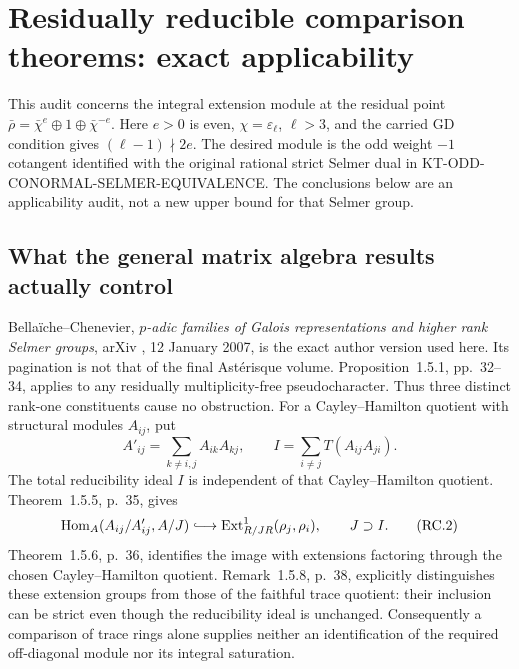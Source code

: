 \documentclass[11pt,a4paper]{article}
\theoremstyle{definition}
\begin{document}


\section{Residually reducible comparison theorems: exact applicability}
\label{sec:kt-reducible-comparison}

This audit concerns the integral extension module at the residual
point $\bar\rho=\bar\chi^e\oplus1\oplus\bar\chi^{-e}$.
Here $e>0$ is even, $\chi=\varepsilon_\ell$, $\ell>3$, and the
carried GD condition gives $(\ell-1)\nmid2e$.  The desired module
is the odd weight $-1$ cotangent identified with the original
rational strict Selmer dual in KT-ODD-CONORMAL-SELMER-EQUIVALENCE.
The conclusions below are an applicability audit, not a new
upper bound for that Selmer group.

\subsection{What the general matrix algebra results actually control}

Bella\"iche--Chenevier, \emph{$p$-adic families of Galois
representations and higher rank Selmer groups}, arXiv
, 12 January 2007, is the exact author
version used here.  Its pagination is not that of the final
Ast\'erisque volume.  Proposition~1.5.1, pp.~32--34, applies
to any residually multiplicity-free pseudocharacter.  Thus
three distinct rank-one constituents cause no obstruction.
For a Cayley--Hamilton quotient with structural modules $A_{ij}$,
put
\[
 A'_{ij}=\sum_{k\ne i,j}A_{ik}A_{kj},\qquad
 I=\sum_{i\ne j}T(A_{ij}A_{ji}).                         \tag{RC.1}
\]
The total reducibility ideal $I$ is independent of that
Cayley--Hamilton quotient.  Theorem~1.5.5, p.~35, gives
\[
 \operatorname{Hom}_A(A_{ij}/A'_{ij},A/J)
       \lhook\joinrel\longrightarrow
       \operatorname{Ext}^1_{R/JR}(\rho_j,\rho_i),
       \qquad J\supset I.                                \tag{RC.2}
\]
Theorem~1.5.6, p.~36, identifies the image with extensions
factoring through the chosen Cayley--Hamilton quotient.
Remark~1.5.8, p.~38, explicitly distinguishes these extension
groups from those of the faithful trace quotient: their
inclusion can be strict even though the reducibility ideal
is unchanged.  Consequently a comparison of trace rings
alone supplies neither an identification of the required
off-diagonal module nor its integral saturation.
\end{document}
